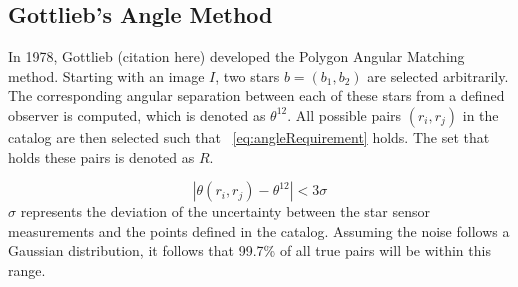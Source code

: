 \begin{figure}
\end{figure}


\subsection{Gottlieb's Angle Method}\label{subsec:gottlieb'sAngleMethod}
In 1978, Gottlieb (citation here) developed the Polygon Angular Matching method.
Starting with an image $I$, two stars $b = (b_1, b_2)$ are selected arbitrarily.
The corresponding angular separation between each of these stars from a defined observer is computed, which is
denoted as $\theta^{12}$.
All possible pairs $(r_i, r_j)$ in the catalog are then selected such that ~\autoref{eq:angleRequirement} holds.
The set that holds these pairs is denoted as $R$.

\begin{equation}
    \label{eq:angleRequirement}
    | \theta(r_i, r_j) - \theta^{12} | < 3 \sigma
\end{equation}
$\sigma$ represents the deviation of the uncertainty between the star sensor measurements and the points defined in the
catalog.
Assuming the noise follows a Gaussian distribution, it follows that 99.7\% of all true pairs will be within this range.

